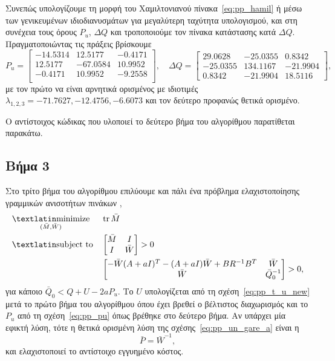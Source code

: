 Συνεπώς υπολογίζουμε τη μορφή  του Χαμιλτονιανού
πίνακα~\eqref{eq:pp_hamil} ή μέσω των γενικευμένων ιδιοδιανυσμάτων για
μεγαλύτερη ταχύτητα υπολογισμού, και στη συνέχεια τους όρους \( P_u \), \(
\Delta Q \) και τροποποιούμε τον πίνακα κατάστασης κατά \( \Delta Q \).
Πραγματοποιώντας τις πράξεις βρίσκουμε
\[
    P_u =
    \begin{bmatrix}
        -14.5314 & 12.5177 & -0.4171 \\
        12.5177 & -67.0584 & 10.9952 \\
        -0.4171 & 10.9952 & -9.2558 \\
    \end{bmatrix}, \quad
    \Delta Q =
    \begin{bmatrix}
        29.0628 & -25.0355 & 0.8342 \\
        -25.0355 & 134.1167 & -21.9904 \\
        0.8342 & -21.9904 & 18.5116
    \end{bmatrix},
\]
με τον πρώτο να είναι αρνητικά ορισμένος με ιδιοτιμές \( \lambda_{1, 2, 3} =
-71.7627, -12.4756, -6.6073 \) και τον δεύτερο προφανώς θετικά ορισμένο.

Ο αντίστοιχος κώδικας  που υλοποιεί το δεύτερο βήμα του αλγορίθμου
παρατίθεται παρακάτω.
\eng{}

\subsection{Βήμα 3}
Στο τρίτο βήμα του αλγορίθμου επιλύουμε και πάλι ένα πρόβλημα ελαχιστοποίησης
γραμμικών ανισοτήτων πινάκων ,
\begin{equation*}
    \begin{aligned}
        & \underset{
            (\bar{M}, \bar{W})
        }{\mathtxt{minimize}}
        & & \tr \bar{M} \\
        & \mathtxt{subject to}
        & &
        \begin{bmatrix}
            \bar{M} & I \\
            I & \bar{W}
        \end{bmatrix} > 0 \\
        &&&
        \begin{bmatrix}
            -\bar{W}(A + aI)^T - (A + aI)\bar{W} + BR^{-1}B^T
            & \bar{W} \\
            \bar{W} & \bar{Q}_0^{-1}\\
        \end{bmatrix} > 0,
    \end{aligned}
\end{equation*}
για κάποιο \( \bar{Q}_0 < Q + U - 2aP_u \). Το \( U \) υπολογίζεται από τη
σχέση~\eqref{eq:pp_t_u_new} μετά το πρώτο βήμα του αλγορίθμου όπου έχει βρεθεί
ο βέλτιστος διαχωρισμός και το \( P_u \) από τη σχέση~\eqref{eq:pp_pu} όπως
βρέθηκε στο δεύτερο βήμα. Αν υπάρχει μία εφικτή λύση, τότε η θετικά ορισμένη
λύση της σχέσης~\eqref{eq:pp_un_gare_a} είναι η
\[
    \bar{P} = \bar{W}^{-1},
\]
και ελαχιστοποιεί το αντίστοιχο εγγυημένο κόστος.

